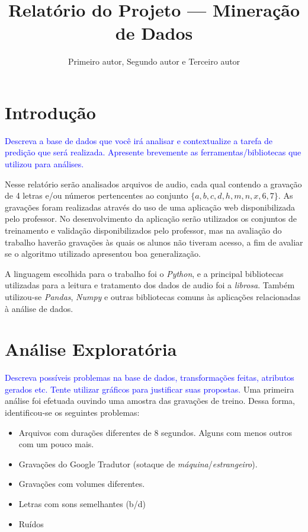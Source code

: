 \documentclass{article}
\title{Relatório do Projeto --- Mineração de Dados}
\author{Primeiro autor, Segundo autor e Terceiro autor}
\date{}
\begin{document}
\maketitle
\section{Introdução}

\textcolor{blue}{Descreva a base de dados que você irá analisar e contextualize a tarefa de
predição que será realizada. Apresente brevemente as ferramentas/bibliotecas que utilizou para análises.}

Nesse relatório serão analisados arquivos de audio, cada qual contendo a gravação de 4 letras e/ou números pertencentes ao conjunto $\{a, b, c, d, h, m, n, x, 6, 7\}$. As gravações foram realizadas através do uso de uma aplicação web disponibilizada pelo professor. No desenvolvimento da aplicação serão utilizados os conjuntos de treinamento e validação disponibilizados pelo professor, mas na avaliação do trabalho haverão gravações às quais os alunos não tiveram acesso, a fim de avaliar se o algoritmo utilizado apresentou boa generalização.

A linguagem escolhida para o trabalho foi o \emph{Python}, e a principal bibliotecas utilizadas para a leitura e tratamento dos dados de audio foi a \emph{librosa}. Também utilizou-se \emph{Pandas}, \emph{Numpy} e outras bibliotecas comuns às aplicações relacionadas à análise de dados.


\section{Análise Exploratória}

\textcolor{blue}{Descreva possíveis problemas na base de dados, transformações feitas, atributos gerados etc.
Tente utilizar gráficos para justificar suas propostas.}
Uma primeira análise foi efetuada ouvindo uma amostra das gravações de treino. Dessa forma, identificou-se os seguintes problemas:
\begin{itemize}
\item Arquivos com durações diferentes de 8 segundos. Alguns com menos outros com um pouco mais.
\item Gravações do Google Tradutor (sotaque de \emph{máquina}/\emph{estrangeiro}).
\item Gravações com volumes diferentes.
\item Letras com sons semelhantes (b/d)
\item Ruídos
\end{itemize}
\end{document}
